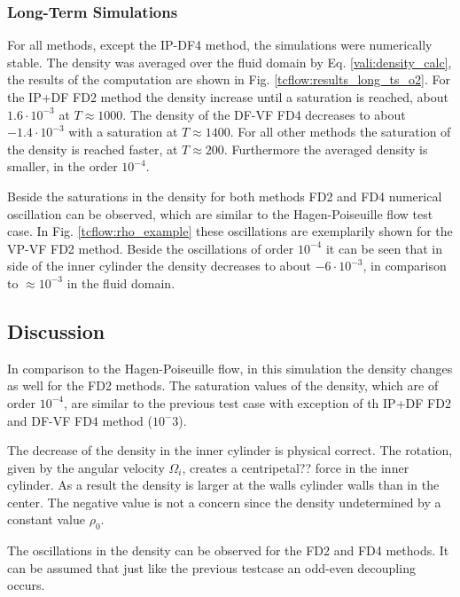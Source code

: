 \clearpage

\subsubsection{Long-Term Simulations}

For all methods, except the IP-DF4 method, the simulations were numerically stable.
The density was averaged over the fluid domain by Eq.  \ref{vali:density_calc},
the results of the computation are shown in Fig. \ref{tcflow:results_long_ts_o2}.
For the IP+DF FD2 method the density increase until a saturation is reached, about $1.6\cdot10^{-3}$ at $T\approx 1000$.
The density of the  DF-VF FD4 decreases to about $-1.4\cdot10^{-3}$ with a saturation at $T\approx1400$.
For all other methods the saturation of the density is reached faster, at $T\approx200$.
Furthermore the averaged density is smaller, in the order $10^{-4}$.

Beside the saturations in the density for both methods FD2 and FD4 numerical oscillation can be
observed, which  are similar to the Hagen-Poiseuille flow test case.
In Fig. \ref{tcflow:rho_example} these oscillations are exemplarily shown for the VP-VF FD2 method.
Beside the oscillations of order $10^{-4}$ it can be seen that in side of the inner cylinder the
density decreases to about $-6\cdot10^{-3}$, in comparison to $\approx10^{-3}$ in the fluid domain.

\subsection{Discussion}

In comparison to the Hagen-Poiseuille flow, in this simulation
the density  changes as well for the FD2 methods.
The saturation values of the density, which are of order $10^{-4}$,
are similar to the previous test case with exception of th IP+DF FD2 and DF-VF FD4 method ($10^-3$).

The decrease of the density in the inner cylinder is physical correct.
The rotation, given by the angular velocity $\Omega_i$, creates a centripetal?? force in the inner cylinder.
As a result the density is larger at the walls cylinder walls than in the center.
The negative value is not a concern since the density undetermined by a constant value $\rho_0$.

The oscillations in the density can be observed for the FD2 and FD4 methods.
It can be assumed that just like the previous testcase an odd-even decoupling occurs.

